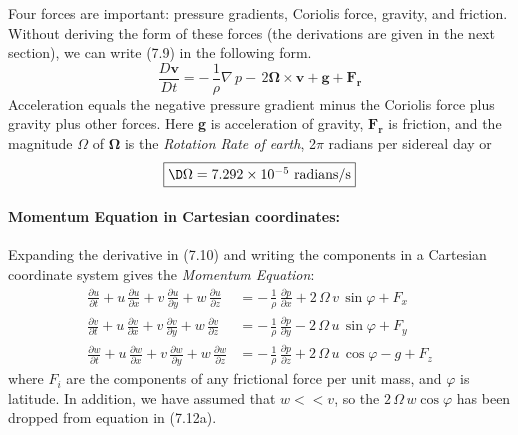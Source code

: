Four forces are important: pressure gradients, Coriolis force,
gravity, and friction. Without deriving the form of these forces (the
derivations are given in the next section), we can write (7.9) in the
following form.
\begin{equation}
\frac{D\mathbf{v}}{Dt} = -\,\frac{1}{\rho}\nabla\,p -
\,2\boldsymbol{\Omega}
\times \mathbf{v} + \mathbf{g} + \mathbf{F_r}
\end{equation}
Acceleration equals the negative pressure gradient minus the Coriolis
force plus gravity plus other forces. Here \textbf{g} is acceleration
of gravity, $\mathbf{F_r}$ is friction, and the magnitude $\Omega$ of
$\boldsymbol{\Omega}$ is the \textit{Rotation Rate of
  earth}, 2$\pi$ radians per
sidereal day or
\begin{equation}
\fbox{$\D
\Omega = 7.292 \times 10^{-5} \text{ radians/s} $}
\end{equation}

\paragraph{Momentum Equation in Cartesian coordinates:}
Expanding the
derivative in (7.10) and writing the components in a Cartesian
coordinate system gives the \textit{Momentum Equation}:
\begin{subequations}
\begin{align}
\frac{\partial{u}}{\partial{t}} + u\,\frac{\partial{u}}{\partial{x}}
+ v\,\frac{\partial{u}}{\partial{y}} +w\,\frac{\partial{u}}{\partial{z}} &=
-\,\frac{1}{\rho}\,\frac{\partial{p}}{\partial{x}} +
2\,\Omega\,{v}\,\sin\varphi +  F_x \\
 \frac{\partial{v}}{\partial{t}} + u\,\frac{\partial{v}}{\partial{x}} +
v\,\frac{\partial{v}}{\partial{y}} +w\,\frac{\partial{v}}{\partial{z}} &=
-\,\frac{1}{\rho}\,\frac{\partial{p}}{\partial{y}} - 2\,\Omega\,u\,\sin\varphi
+ F_y
\\
 \frac{\partial{w}}{\partial{t}} + u\,\frac{\partial{w}}{\partial{x}} +
v\,\frac{\partial{w}}{\partial{y}} +w\,\frac{\partial{w}}{\partial{z}} &=
-\,\frac{1}{\rho}\,\frac{\partial{p}}{\partial{z}} + 2\,\Omega\,{u}\,\cos\varphi
- g + F_z
\end{align}
\end{subequations}
where $F_i$ are the components of any frictional force per unit mass,
and $\varphi$ is latitude. In addition, we have assumed that $w << v$,
so the $2\,\Omega\,w \cos \varphi$ has been dropped from equation in
(7.12a).

